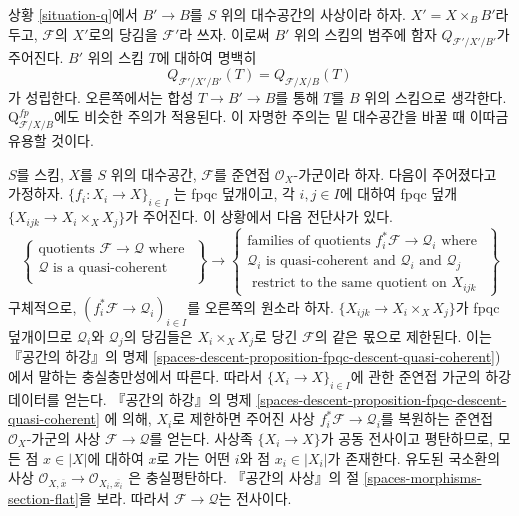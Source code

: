 \begin{remark}
\label{remark-q-base-change}
상황 \ref{situation-q}에서 $B' \to B$를 $S$ 위의 대수공간의 사상이라 하자.
$X' = X \times_B B'$라 두고, $\mathcal{F}$의 $X'$로의 당김을
$\mathcal{F}'$라 쓰자. 이로써 $B'$ 위의 스킴의 범주에 함자
$Q_{\mathcal{F}'/X'/B'}$가 주어진다. $B'$ 위의 스킴 $T$에 대하여 명백히
$$
Q_{\mathcal{F}'/X'/B'}(T) = Q_{\mathcal{F}/X/B}(T)
$$
가 성립한다. 오른쪽에서는 합성 $T \to B' \to B$를 통해 $T$를
$B$ 위의 스킴으로 생각한다. $\text{Q}^{fp}_{\mathcal{F}/X/B}$에도
비슷한 주의가 적용된다. 이 자명한 주의는 밑 대수공간을 바꿀 때
이따금 유용할 것이다.
\end{remark}

\begin{remark}
\label{remark-q-sheaf}
$S$를 스킴, $X$를 $S$ 위의 대수공간, $\mathcal{F}$를 준연접
$\mathcal{O}_X$-가군이라 하자. 다음이 주어졌다고 가정하자.
$\{f_i : X_i \to X\}_{i \in I}$
는 fpqc 덮개이고, 각 $i, j \in I$에 대하여 fpqc 덮개
$\{X_{ijk} \to X_i \times_X X_j\}$가 주어진다. 이 상황에서 다음 전단사가 있다.
$$
\left\{
\begin{matrix}
\text{quotients }\mathcal{F} \to \mathcal{Q}\text{ where } \\
\mathcal{Q}\text{ is a quasi-coherent }\\
\end{matrix}
\right\}
\longrightarrow
\left\{
\begin{matrix}
\text{families of quotients }f_i^*\mathcal{F} \to \mathcal{Q}_i
\text{ where } \\
\mathcal{Q}_i\text{ is quasi-coherent and }
\mathcal{Q}_i\text{ and }\mathcal{Q}_j\\
\text{ restrict to the same quotient on }X_{ijk}
\end{matrix}
\right\}
$$
구체적으로, $(f_i^*\mathcal{F} \to \mathcal{Q}_i)_{i \in I}$를
오른쪽의 원소라 하자. $\{X_{ijk} \to X_i \times_X X_j\}$가 fpqc 덮개이므로
$\mathcal{Q}_i$와 $\mathcal{Q}_j$의 당김들은 $X_i \times_X X_j$로 당긴
$\mathcal{F}$의 같은 몫으로 제한된다. 이는 『공간의 하강』의 명제
\ref{spaces-descent-proposition-fpqc-descent-quasi-coherent})에서 말하는
충실충만성에서 따른다. 따라서 $\{X_i \to X\}_{i \in I}$에 관한
준연접 가군의 하강 데이터를 얻는다. 『공간의 하강』의 명제
\ref{spaces-descent-proposition-fpqc-descent-quasi-coherent}
에 의해, $X_i$로 제한하면 주어진 사상
$f_i^*\mathcal{F} \to \mathcal{Q}_i$를 복원하는 준연접
$\mathcal{O}_X$-가군의 사상 $\mathcal{F} \to \mathcal{Q}$를 얻는다.
사상족 $\{X_i \to X\}$가 공동 전사이고 평탄하므로, 모든 점
$x \in |X|$에 대하여 $x$로 가는 어떤 $i$와 점 $x_i \in |X_i|$가 존재한다.
유도된 국소환의 사상
$\mathcal{O}_{X, \overline{x}} \to \mathcal{O}_{X_i, \overline{x_i}}$
은 충실평탄하다. 『공간의 사상』의 절
\ref{spaces-morphisms-section-flat}을 보라.
따라서 $\mathcal{F} \to \mathcal{Q}$는 전사이다.
\end{remark}

